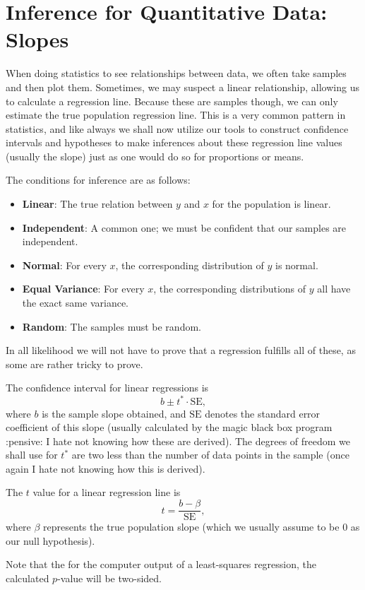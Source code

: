 \section{Inference for Quantitative Data: Slopes}

When doing statistics to see relationships between data, we often take samples
and then plot them. Sometimes, we may suspect a linear relationship, allowing
us to calculate a regression line. Because these are samples though, we can
only estimate the true population regression line. This is a very common
pattern in statistics, and like always we shall now utilize our tools to
construct confidence intervals and hypotheses to make inferences about these
regression line values (usually the slope) just as one would do so for
proportions or means.

The conditions for inference are as follows:
\begin{itemize}
    \item \textbf{Linear}: The true relation between \( y \) and \( x \) for the population is
        linear.
    \item \textbf{Independent}: A common one; we must be confident that our
        samples are independent.
    \item \textbf{Normal}: For every \( x \), the corresponding distribution of
        \( y \) is normal.
    \item \textbf{Equal Variance}: For every \( x \), the corresponding
        distributions of \( y \) all have the exact same variance.
    \item \textbf{Random}: The samples must be random.
\end{itemize}
In all likelihood we will not have to prove that a regression fulfills all of
these, as some are rather tricky to prove.

The confidence interval for linear regressions is
\[
    b \pm t^* \cdot \text{SE}
,\]
where \( b \) is the sample slope obtained, and \( \text{SE} \) denotes the
standard error coefficient of this slope (usually calculated by the magic black
box program :pensive: I hate not knowing how these are derived). The degrees of
freedom we shall use for \( t^* \) are two less than the number of data points
in the sample (once again I hate not knowing how this is derived).

The \( t \) value for a linear regression line is
\[
    t = \frac{b - \beta}{\text{SE}}
,\]
where \( \beta \) represents the true population slope (which we usually assume
to be \( 0 \) as our null hypothesis).

Note that the for the computer output of a least-squares regression, the
calculated \( p \)-value will be two-sided.
